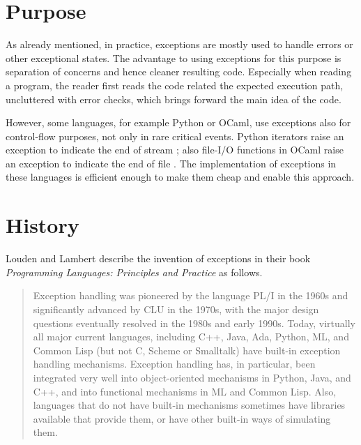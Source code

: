 
\section{Purpose}

As already mentioned, in practice, exceptions are mostly used to handle errors or
other exceptional states. The advantage to using
exceptions for this purpose is separation of concerns and hence cleaner resulting code.
Especially when reading a program, the reader first reads the code related the expected
execution path, uncluttered with error checks, which brings forward the main idea
of the code.

However, some languages, for example Python or OCaml, use exceptions also for control-flow
purposes, not only in rare critical events. Python iterators raise an exception to
indicate the end of stream \cite{python:reference}; also file-I/O functions in OCaml raise
an exception to indicate the end of file \cite{ocaml:reference}. The implementation of
exceptions in these languages is efficient enough to make them cheap and enable this approach.


\section{History}

Louden and Lambert describe the invention of exceptions in their book
\emph{Programming Languages: Principles and Practice} as follows.

\begin{quote}
Exception handling was pioneered by the language PL/I in the 1960s and
significantly advanced by CLU in the 1970s, with the major design questions
eventually resolved in the 1980s and early 1990s. Today, virtually all major
current languages, including C++, Java, Ada, Python, ML, and Common Lisp (but
not C, Scheme or Smalltalk) have built-in exception handling mechanisms.
Exception handling has, in particular, been integrated very well into
object-oriented mechanisms in Python, Java, and C++, and into functional
mechanisms in ML and Common Lisp. Also, languages that do not have built-in
mechanisms sometimes have libraries available that provide them, or have other
built-in ways of simulating them. \cite[p.~423]{louden:languages}
\end{quote}


